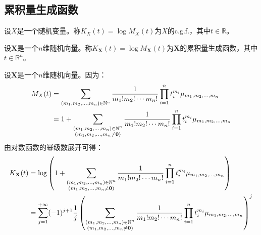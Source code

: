 \subsection{累积量生成函数}
\begin{definition}
	设$X$是一个随机变量。称$K_X(t)=\log M_X(t)$为$X$的\gls{c.g.f.}，其中$t\in\mathbb{R}$。
\end{definition}
\begin{definition}
	设$\mathbf{X}$是一个$n$维随机向量。称$K_\mathbf{X}(t)=\log M_\mathbf{X}(t)$为$\mathbf{X}$的累积量生成函数，其中$t\in\mathbb{R}^{n}$。
\end{definition}
\begin{definition}
	设$\mathbf{X}$是一个$n$维随机向量。因为：
	\begin{align*}
		M_X(t)&=\sum_{(m_1, m_2, \dots, m_{n})\in\mathbb{N}^n}\frac{1}{m_1!m_2!\cdots m_n!}\prod_{i=1}^{n}t_i^{m_i}\mu_{m_1, m_2, \dots, m_{n}} \\
		&=1+\sum_{\substack{(m_1, m_2, \dots, m_{n})\in\mathbb{N}^n \\ (m_1, m_2, \dots, m_{n}\ne\mathbf{0})}}\frac{1}{m_1!m_2!\cdots m_n!}\prod_{i=1}^{n}t_i^{m_i}\mu_{m_1, m_2, \dots, m_{n}}
	\end{align*}
	由对数函数的幂级数展开可得：
	\begin{align*}
		K_\mathbf{X}(t)
		&=\log\left(1+\sum_{\substack{(m_1, m_2, \dots, m_{n})\in\mathbb{N}^n \\ (m_1, m_2, \dots, m_{n}\ne\mathbf{0})}}\frac{1}{m_1!m_2!\cdots m_n!}\prod_{i=1}^{n}t_i^{m_i}\mu_{m_1, m_2, \dots, m_{n}}\right) \\
		&=\sum_{j=1}^{+\infty}(-1)^{j+1}\frac{1}{j}\left(\sum_{\substack{(m_1, m_2, \dots, m_{n})\in\mathbb{N}^n \\ (m_1, m_2, \dots, m_{n}\ne\mathbf{0})}}\frac{1}{m_1!m_2!\cdots m_n!}\prod_{i=1}^{n}t_i^{m_i}\mu_{m_1, m_2, \dots, m_{n}}\right)^j
	\end{align*}
\end{definition}

